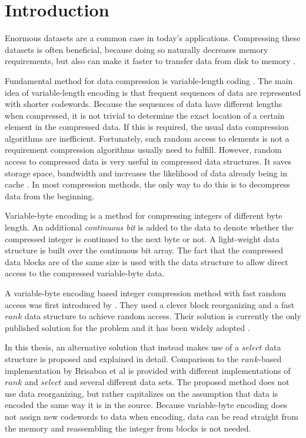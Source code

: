 \chapter{Introduction}
Enormous datasets are a common case in today's applications. Compressing these datasets is often beneficial, because doing so 
naturally decreases memory requirements, but also can make it faster to transfer data from disk to memory \citep{Zob95}. 

Fundamental method for data compression is variable-length coding \citep{Sal99}. The main idea of variable-length encoding is that 
frequent sequences of data are represented with shorter codewords. Because the sequences of data have different lengths when compressed, it is 
not trivial to determine the exact location of a certain element in the compressed data. If this is required, the usual 
data compression algorithms are inefficient. Fortunately, such random access to elements is not a requirement compression algorithms usually 
need to fulfill. However, random access to compressed data is very useful in compressed data structures. It saves storage space, bandwidth and 
increases the likelihood of data already being in cache \citep{Sch02}. In most compression methods, the only way to do this is to decompress data 
from the beginning. 

Variable-byte encoding is a method for compressing integers of different byte length. An additional \textit{continuous bit} is added to the data to denote whether the compressed integer
is continued to the next byte or not. A light-weight data structure is built over the continuous bit array. The fact that the compressed data blocks are of the same size is used
with the data structure to allow direct access to the compressed variable-byte data.

A variable-byte encoding based integer compression method with fast random access was first introduced by \citep{Bri09}. They used a clever block 
reorganizing and a fast $rank$ data structure to achieve random access. Their solution is currently the only published solution for the problem and it 
has been widely adopted \citep[e.g.][]{Kon17, Sha16}. 

In this thesis, an alternative solution that instead makes use of a $select$ data structure is proposed and explained in detail. Comparison to the $rank$-based 
implementation by Brisaboa et al is provided with different implementations of $rank$ and $select$ and several different data sets. The proposed method does not use data 
reorganizing, but rather capitalizes on the assumption that data is encoded the same way it is in the source. Because variable-byte encoding does not assign 
new codewords to data when encoding, data can be read straight from the memory and reassembling the integer from blocks is not needed.

